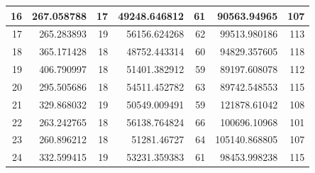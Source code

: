 \begin{table}
\begin{adjustwidth}{}{}
{{\begin{tabular}{|r|r|r|r|r|r|r|}
					\hline
					16                                         & 267.058788                   & 17                                    & 49248.646812                   & 61                                    & 90563.94965                  & 107                                    \\ 
					\hline
					17                                         & 265.283893                   & 19                                    & 56156.624268                   & 62                                    & 99513.980186                 & 113                                    \\ 
					\hline
					18                                         & 365.171428                   & 18                                    & 48752.443314                   & 60                                    & 94829.357605                 & 118                                    \\ 
					\hline
					19                                         & 406.790997                   & 18                                    & 51401.382912                   & 59                                    & 89197.608078                 & 112                                    \\ 
					\hline
					20                                         & 295.505686                   & 18                                    & 54511.452782                   & 63                                    & 89742.548553                 & 115                                    \\ 
					\hline
					21                                         & 329.868032                   & 19                                    & 50549.009491                   & 59                                    & 121878.61042                 & 108                                    \\ 
					\hline
					22                                         & 263.242765                   & 18                                    & 56138.764824                   & 66                                    & 100696.10968                 & 101                                    \\ 
					\hline
					23                                         & 260.896212                   & 18                                    & 51281.46727                    & 64                                    & 105140.868805                & 107                                    \\ 
					\hline
					24                                         & 332.599415                   & 19                                    & 53231.359383                   & 61                                    & 98453.998238                 & 115                                    \\ 

\end{tabular}}}
\end{adjustwidth}
\end{table}
